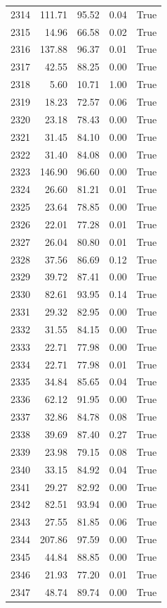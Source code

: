 \begin{longtable}{rrrrr}
2314 & 111.71 & 95.52 & 0.04 & True \\
2315 & 14.96 & 66.58 & 0.02 & True \\
2316 & 137.88 & 96.37 & 0.01 & True \\
2317 & 42.55 & 88.25 & 0.00 & True \\
2318 & 5.60 & 10.71 & 1.00 & True \\
2319 & 18.23 & 72.57 & 0.06 & True \\
2320 & 23.18 & 78.43 & 0.00 & True \\
2321 & 31.45 & 84.10 & 0.00 & True \\
2322 & 31.40 & 84.08 & 0.00 & True \\
2323 & 146.90 & 96.60 & 0.00 & True \\
2324 & 26.60 & 81.21 & 0.01 & True \\
2325 & 23.64 & 78.85 & 0.00 & True \\
2326 & 22.01 & 77.28 & 0.01 & True \\
2327 & 26.04 & 80.80 & 0.01 & True \\
2328 & 37.56 & 86.69 & 0.12 & True \\
2329 & 39.72 & 87.41 & 0.00 & True \\
2330 & 82.61 & 93.95 & 0.14 & True \\
2331 & 29.32 & 82.95 & 0.00 & True \\
2332 & 31.55 & 84.15 & 0.00 & True \\
2333 & 22.71 & 77.98 & 0.00 & True \\
2334 & 22.71 & 77.98 & 0.01 & True \\
2335 & 34.84 & 85.65 & 0.04 & True \\
2336 & 62.12 & 91.95 & 0.00 & True \\
2337 & 32.86 & 84.78 & 0.08 & True \\
2338 & 39.69 & 87.40 & 0.27 & True \\
2339 & 23.98 & 79.15 & 0.08 & True \\
2340 & 33.15 & 84.92 & 0.04 & True \\
2341 & 29.27 & 82.92 & 0.00 & True \\
2342 & 82.51 & 93.94 & 0.00 & True \\
2343 & 27.55 & 81.85 & 0.06 & True \\
2344 & 207.86 & 97.59 & 0.00 & True \\
2345 & 44.84 & 88.85 & 0.00 & True \\
2346 & 21.93 & 77.20 & 0.01 & True \\
2347 & 48.74 & 89.74 & 0.00 & True \\

\end{longtable}
